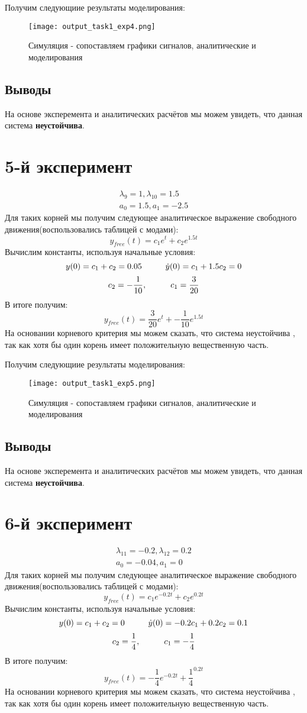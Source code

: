 Получим следующиие результаты моделирования:
\begin{figure}[ht]
    \centering
    \texttt{[image: output\_task1\_exp4.png]}
	\caption{Симуляция - сопоставляем графики сигналов, аналитические и моделирования}
\end{figure}
\subsection{Выводы}
На основе эксперемента и аналитических расчётов мы можем увидеть, что данная система \textbf{неустойчива}.


\newpage
\section{5-й эксперимент}
$$
\begin{aligned}
    \lambda_9 = 1, \lambda_{10}=1.5 \\
    a_0 = 1.5, a_1 = -2.5
\end{aligned}
$$
Для таких корней мы получим следующее аналитическое выражение свободного движения(воспользовались таблицей с модами):
$$
y_{free}(t) = c_1e^{t} + c_2e^{1.5t}
$$
Вычислим константы, используя начальные условия:
$$
    y(0) = c_1 + c_2 = 0.05 \hspace*{1cm} \dot{y}(0) = c_1 + 1.5c_2 = 0
$$
$$
    c_2 = -\frac{1}{10}, \hspace*{1cm} c_1 = \frac{3}{20}
$$
В итоге получим:
$$
y_{free}(t) = \frac{3}{20}e^{t} + -\frac{1}{10}e^{1.5t}
$$
На основании корневого критерия мы можем сказать, что система неустойчива , так как хотя бы один корень имеет положительную вещественную часть.

Получим следующиие результаты моделирования:
\begin{figure}[ht]
    \centering
    \texttt{[image: output\_task1\_exp5.png]}
	\caption{Симуляция - сопоставляем графики сигналов, аналитические и моделирования}
\end{figure}
\subsection{Выводы}
На основе эксперемента и аналитических расчётов мы можем увидеть, что данная система \textbf{неустойчива}.

\newpage
\section{6-й эксперимент}
$$
\begin{aligned}
    \lambda_{11} = -0.2, \lambda_{12}=0.2 \\
    a_0 = -0.04, a_1 = 0
\end{aligned}
$$
Для таких корней мы получим следующее аналитическое выражение свободного движения(воспользовались таблицей с модами):
$$
y_{free}(t) = c_1e^{-0.2t} + c_2e^{0.2t} 
$$
Вычислим константы, используя начальные условия:
$$
    y(0) = c_1 + c_2 = 0 \hspace*{1cm} \dot{y}(0) = -0.2c_1 + 0.2c_2 = 0.1
$$
$$
    c_2 = \frac{1}{4}, \hspace*{1cm} c_1 = -\frac{1}{4}
$$
В итоге получим:
$$
y_{free}(t) = -\frac{1}{4}e^{-0.2t} + \frac{1}{4}^{0.2t} 
$$
На основании корневого критерия мы можем сказать, что система неустойчива , так как хотя бы один корень имеет положительную вещественную часть.


